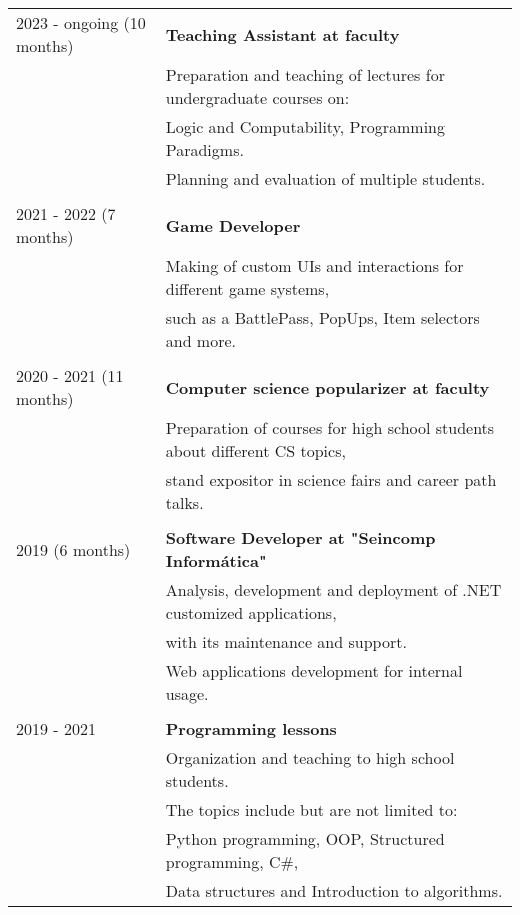 \documentclass{article}
\begin{document}
\begin{tabular}{l | l}
    2023 - ongoing (10 months) & \textbf{Teaching Assistant at faculty} \\
                            & Preparation and teaching of lectures for undergraduate courses on: \\
                            & Logic and Computability, Programming Paradigms. \\ 
                            & Planning and evaluation of multiple students. \\
                            \\
    2021 - 2022 (7 months) & \textbf{Game Developer} \\
                            & Making of custom UIs and interactions for different game systems, \\
                            & such as a BattlePass, PopUps, Item selectors and more. \\
                            \\
    2020 - 2021 (11 months) & \textbf{Computer science popularizer at faculty} \\
                            & Preparation of courses for high school students about different CS topics, \\ 
                            & stand expositor in science fairs and career path talks. \\
                            \\
    2019 (6 months) & \textbf{Software Developer at "Seincomp Informática"} \\
                    &  Analysis, development and deployment of .NET customized applications, \\ 
                    & with its maintenance and support. \\
                    & Web applications development for internal usage.\\
                    \\
    2019 - 2021     & \textbf{Programming lessons}  \\
                    & Organization and teaching to high school students. \\
                    & The topics include but are not limited to: \\ 
                    & Python programming, OOP, Structured programming, C\#, \\ 
                    & Data structures and Introduction to algorithms.
\end{tabular}
\end{document}
